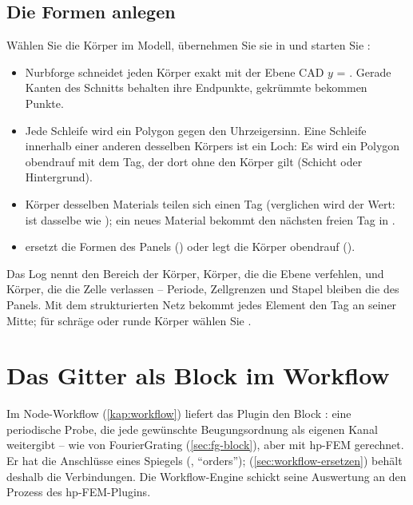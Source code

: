\subsection{Die Formen anlegen}

Wählen Sie die Körper im Modell, übernehmen Sie sie in  und starten Sie
:

\begin{itemize}
  \item Nurbforge schneidet jeden Körper exakt mit der Ebene CAD $y$ = .
    Gerade Kanten des Schnitts behalten ihre Endpunkte, gekrümmte bekommen  Punkte.
  \item Jede Schleife wird ein Polygon gegen den Uhrzeigersinn. Eine Schleife innerhalb einer
    anderen desselben Körpers ist ein Loch: Es wird ein Polygon obendrauf mit dem Tag, der dort
    ohne den Körper gilt (Schicht oder Hintergrund).
  \item Körper desselben Materials teilen sich einen Tag (verglichen wird der Wert:
     ist dasselbe wie ); ein neues Material bekommt den nächsten
    freien Tag in .
  \item {} ersetzt die Formen des Panels () oder legt die Körper
    obendrauf ().
\end{itemize}

Das Log nennt den Bereich der Körper, Körper, die die Ebene verfehlen, und Körper, die die Zelle
verlassen -- Periode, Zellgrenzen und Stapel bleiben die des Panels. Mit dem strukturierten Netz
bekommt jedes Element den Tag an seiner Mitte; für schräge oder runde Körper wählen Sie
 .

\section{Das Gitter als Block im Workflow}\label{sec:hp-block}

Im Node-Workflow (\autoref{kap:workflow}) liefert das Plugin den Block : eine
periodische Probe, die jede gewünschte Beugungsordnung als eigenen Kanal weitergibt -- wie
 von FourierGrating (\autoref{sec:fg-block}), aber mit hp-FEM gerechnet. Er hat
die Anschlüsse eines Spiegels (,  \enquote{orders});  (\autoref{sec:workflow-ersetzen})
behält deshalb die Verbindungen. Die Workflow-Engine schickt seine Auswertung an den Prozess des
hp-FEM-Plugins.

